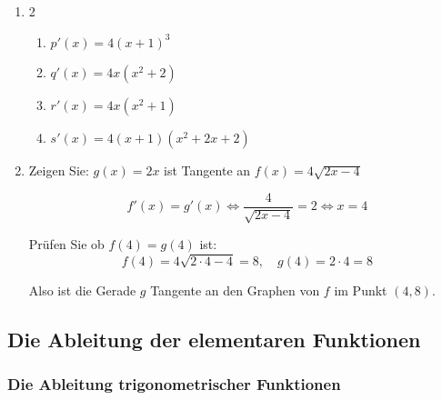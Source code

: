 \begin{enumerate}
    \item \begin{multicols}{2}
              \begin{enumerate}
                  \item $p'(x)=4(x+1)^3$
                  \item $q'(x)=4x(x^2+2)$
                  \item $r'(x)=4x(x^2+1)$
                  \item $s'(x)=4(x+1)(x^2+2x+2)$
              \end{enumerate}
    \end{multicols}

    \item Zeigen Sie: \( g(x) = 2x \) ist Tangente an \( f(x) = 4\sqrt{2x - 4} \)

          $$f'(x) = g'(x) \iff \dfrac{4}{\sqrt{2x - 4}} = 2 \iff x = 4$$

          Prüfen Sie ob $f(4) = g(4)$ ist:
          $$ f(4) = 4\sqrt{2\cdot 4 -4} = 8, \quad g(4) = 2\cdot 4 = 8$$

          Also ist die Gerade \( g \) Tangente an den Graphen von \( f \) im Punkt \( (4, 8) \).
\end{enumerate}
















































\clearpage
\subsection{Die Ableitung der elementaren Funktionen}
\subsubsection{ Die Ableitung trigonometrischer Funktionen}
